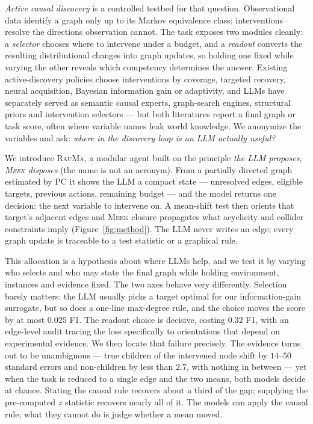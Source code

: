 \documentclass{article}
\newcommand{\rauma}{\textsc{RauMa}}
\newcommand{\meek}{\textsc{Meek}}
\begin{document}
\emph{Active causal discovery} is a controlled testbed for that question. Observational data
identify a graph only up to its Markov equivalence class; interventions resolve the directions
observation cannot. The task exposes two modules cleanly: a \emph{selector} chooses where to
intervene under a budget, and a \emph{readout} converts the resulting distributional changes into
graph updates, so holding one fixed while varying the other reveals which competency determines
the answer. Existing active-discovery policies choose interventions by coverage, targeted
recovery, neural acquisition, Bayesian information gain or adaptivity, and LLMs have separately
served as semantic causal experts, graph-search engines, structural priors and intervention
selectors --- but both literatures report a final graph or task score, often where variable names
leak world knowledge. We anonymize the variables and ask: \emph{where in the discovery loop is an
LLM actually useful?}

We introduce \rauma{}, a modular agent built on the principle \emph{the LLM proposes, \meek{}
disposes} (the name is not an acronym). From a partially directed graph estimated by PC it
shows the LLM a compact state --- unresolved edges, eligible targets, previous actions,
remaining budget --- and the model returns one decision: the next variable to intervene on. A
mean-shift test then orients that target's adjacent edges and \meek{} closure propagates what
acyclicity and collider constraints imply (Figure~\ref{fig:method}). The LLM never writes an
edge; every graph update is traceable to a test statistic or a graphical rule.

This allocation is a hypothesis about where LLMs help, and we test it by varying who selects
and who may state the final graph while holding environment, instances and evidence fixed. The
two axes behave very differently. Selection barely matters: the LLM usually picks a target
optimal for our information-gain surrogate, but so does a one-line max-degree rule, and the
choice moves the score by at most $0.025$ F1. The readout choice is decisive, costing $0.32$
F1, with an edge-level audit tracing the loss specifically to orientations that depend on
experimental evidence. We then locate that failure precisely. The evidence turns out to be
unambiguous --- true children of the intervened node shift by $14$--$50$ standard errors and
non-children by less than $2.7$, with nothing in between --- yet when the task is reduced to a
single edge and the two means, both models decide at chance. Stating the causal rule recovers
about a third of the gap; supplying the pre-computed $z$ statistic recovers nearly all of it.
The models can apply the causal rule; what they cannot do is judge whether a mean moved.
\end{document}
